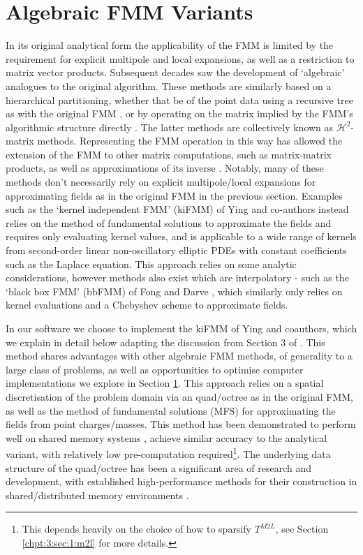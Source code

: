 \section{Algebraic FMM Variants}\label{chpt:2:sec:1}

In its original analytical form the applicability of the FMM is limited by the requirement for explicit multipole and local expansions, as well as a restriction to matrix vector products. Subsequent decades saw the development of `algebraic' analogues to the original algorithm. These methods are similarly based on a hierarchical partitioning, whether that be of the point data using a recursive tree as with the original FMM \cite{Ying:2004:JCP,fong2009black}, or by operating on the matrix implied by the FMM's algorithmic structure directly \cite{hackbusch1999sparse,borm2003introduction,chandrasekaran2007fast}. The latter methods are collectively known as $\mathcal{H}^2$-matrix methods. Representing the FMM operation in this way has allowed the extension of the FMM to other matrix computations, such as matrix-matrix products, as well as approximations of its inverse \cite{ambikasaran2014inverse}. Notably, many of these methods don't necessarily rely on explicit multipole/local expansions for approximating fields as in the original FMM in the previous section. Examples such as the `kernel independent FMM' (kiFMM) of Ying and co-authors instead relies on the method of fundamental solutions to approximate the fields and requires only evaluating kernel values, and is applicable to a wide range of kernels from second-order linear non-oscillatory elliptic PDEs with constant coefficients such as the Laplace equation. This approach relies on some analytic considerations, however methods also exist which are interpolatory - such as the `black box FMM' (bbFMM) of Fong and Darve \cite{fong2009black}, which similarly only relies on kernel evaluations and a Chebyshev scheme to approximate fields.

In our software we choose to implement the kiFMM of Ying and coauthors, which we explain in detail below adapting the discussion from Section 3 of \cite{Ying:2004:JCP}. This method shares advantages with other algebraic FMM methods, of generality to a large class of problems, as well as opportunities to optimise computer implementations we explore in Section \ref{chpt:2:sec:1}. This approach relies on a spatial discretisation of the problem domain via an quad/octree as in the original FMM, as well as the method of fundamental solutions (MFS) for approximating the fields from point charges/masses. This method has been demonstrated to perform well on shared memory systems \cite{wang2021exafmm}, achieve similar accuracy to the analytical variant, with relatively low pre-computation required\footnote{This depends heavily on the choice of how to sparsify $T^{M2L}$, see Section \ref{chpt:3:sec:1:m2l} for more details.}. The underlying data structure of the quad/octree has been a significant area of research and development, with established high-performance methods for their construction in shared/distributed memory environments \cite{sundar2008bottom,sundar2013hyksort,BursteddeWilcoxGhattas11}.

